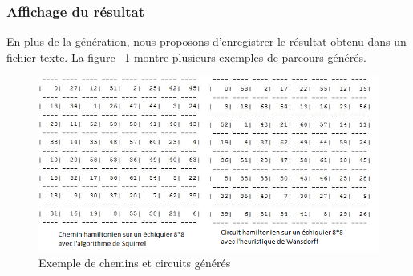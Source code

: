 \subsubsection{Affichage du résultat}
En plus de la génération, nous proposons d'enregistrer le résultat obtenu dans un fichier texte. La figure ~\ref{ExempleImpression} montre plusieurs exemples de parcours générés.

\begin{figure}[h]
\begin{center}
   \includegraphics[scale=0.6]{img/exempleimpression.png} 
   \caption{\label{ExempleImpression} Exemple de chemins et circuits générés}
   \end{center}
\end{figure}